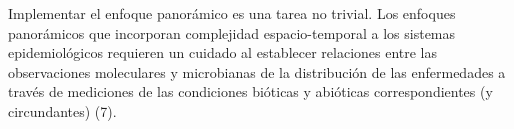 Implementar el enfoque panorámico es una tarea no trivial. Los enfoques
panorámicos que incorporan complejidad espacio-temporal a los sistemas
epidemiológicos requieren un cuidado al establecer relaciones entre las
observaciones moleculares y microbianas de la distribución de las enfermedades
a través de mediciones de las condiciones bióticas y abióticas
correspondientes (y circundantes) (7).



